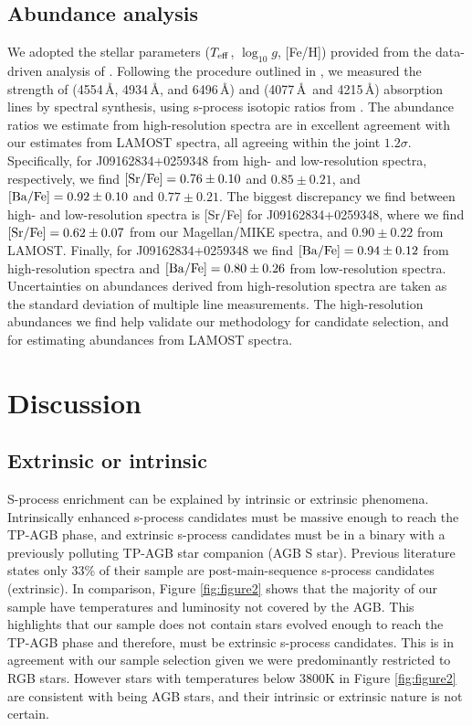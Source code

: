 \documentclass[a4paper,fleqn,usenatbib]{mnras}
\begin{document}
\subsection{Abundance analysis}
We adopted the stellar parameters ($T_{\rm eff}$, $\log_{10}g$, [Fe/H]) provided from the data-driven analysis of \citet{ho2017}. Following the procedure outlined in \citet{casey2014}, we measured the strength of  (4554\,\AA, 4934\,\AA, and 6496\,\AA) and  (4077\,\AA\ and 4215\,\AA) absorption lines by spectral synthesis, using s-process isotopic ratios from \citet{sneden08}. The abundance ratios we estimate from high-resolution spectra are in excellent agreement with our estimates from LAMOST spectra, all agreeing within the joint $1.2\sigma$. Specifically, for J09162834+0259348 from high- and low-resolution spectra, respectively, we find $[{\rm Sr/Fe}] = 0.76 \pm 0.10$ and $0.85 \pm 0.21$, and $[{\rm Ba/Fe}] = 0.92 \pm 0.10$ and $0.77 \pm 0.21$. The biggest discrepancy we find between high- and low-resolution spectra is [Sr/Fe] for J09162834+0259348, where we find $[{\rm Sr/Fe}] = 0.62 \pm 0.07$ from our Magellan/MIKE spectra, and $0.90 \pm 0.22$ from LAMOST. Finally, for J09162834+0259348 we find $[{\rm Ba/Fe}] = 0.94 \pm 0.12$ from high-resolution spectra and $[{\rm Ba/Fe}] = 0.80 \pm 0.26$ from low-resolution spectra. Uncertainties on abundances derived from high-resolution spectra are taken as the standard deviation of multiple line measurements. The high-resolution abundances we find help validate our methodology for candidate selection, and for estimating abundances from LAMOST spectra.




\section{Discussion}  \label{sec:dis}


\subsection{Extrinsic or intrinsic}
S-process enrichment can be explained by intrinsic or extrinsic phenomena. Intrinsically enhanced s-process candidates must be massive enough to reach the TP-AGB phase, and extrinsic s-process candidates must be in a binary with a previously polluting TP-AGB star companion (AGB S star). Previous literature \citep{van2017} states only 33\% of their sample are post-main-sequence s-process candidates (extrinsic). In comparison, Figure \ref{fig:figure2} shows that the majority of our sample have temperatures and luminosity not covered by the AGB. This highlights that our sample does not contain stars evolved enough to reach the TP-AGB phase and therefore, must be extrinsic s-process candidates. This is in agreement with our sample selection given we were predominantly restricted to RGB stars. However stars with temperatures below 3800K in Figure \ref{fig:figure2} are consistent with being AGB stars, and their intrinsic or extrinsic nature is not certain. 
\end{document}
